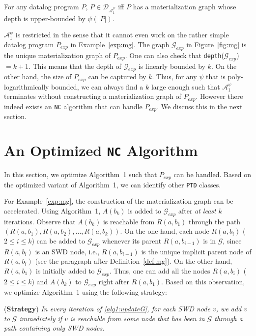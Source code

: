 \documentclass{article}
\begin{document}
\begin{theorem}
For any datalog program $P$, $P\in\mathcal{D}_{\mathcal{A}_1^{\psi}}$ iff $P$ has a materialization graph whose depth is upper-bounded by $\psi(|P|)$.
\end{theorem}

$\mathcal{A}_1^{\psi}$ is restricted in the sense that it cannot even work on the rather simple datalog program $P_{exp}$ in Example~\ref{exp:mg}. The graph $\mathcal{G}_{exp}$ in Figure~\ref{fig:mg} is the unique materialization graph of $P_{exp}$. One can also check that \texttt{depth}($\mathcal{G}_{exp}$)$=k+1$. This means that the depth of $\mathcal{G}_{exp}$ is linearly bounded by $k$. On the other hand, the size of $P_{exp}$ can be captured by $k$. Thus, for any $\psi$ that is poly-logarithmically bounded, we can always find a $k$  large enough such that $\mathcal{A}_1^{\psi}$ terminates without constructing a materialization graph of $P_{exp}$. However there indeed exists an \texttt{NC} algorithm that can handle $P_{exp}$. We discuss this in the next section.

\section{An Optimized \texttt{NC} Algorithm}

In this section, we optimize Algorithm~1 such that $P_{exp}$
can be handled. Based on the optimized variant of Algorithm~1, we can identify other \texttt{PTD} classes.

For Example~\ref{exp:mg}, the construction of the materialization graph can be accelerated. Using Algorithm~1, $A(b_k)$ is added to $\mathcal{G}_{exp}$ after \emph{at least} $k$ iterations. Observe that $A(b_k)$ is reachable from $R(a,b_1)$ through the path $(R(a,b_1),R(a,b_2),...,R(a,b_k))$. On the one hand, each node $R(a,b_i)$ ($2\leq i\leq k$) can be added to $\mathcal{G}_{exp}$ whenever its parent $R(a,b_{i-1})$ is in $\mathcal{G}$, since $R(a,b_i)$ is an SWD node, i.e., $R(a,b_{i-1})$ is the unique implicit parent node of $R(a,b_{i})$ (see the paragraph after Definition~\ref{def:mg}). On the other hand, $R(a,b_1)$ is initially added to $\mathcal{G}_{exp}$. Thus, one can add all the nodes $R(a,b_i)$ ($2\leq i\leq k$) and $A(b_k)$ to $\mathcal{G}_{exp}$ right after $R(a,b_1)$. Based on this observation, we optimize Algorithm~1 using the following strategy:

(\textbf{Strategy}) \emph{In every iteration of \ref{alg1:updateG}, for each SWD node $v$, we add $v$ to $\mathcal{G}$ immediately if $v$ is reachable from some node that has been in $\mathcal{G}$ through a path containing only SWD nodes}.
\end{document}
